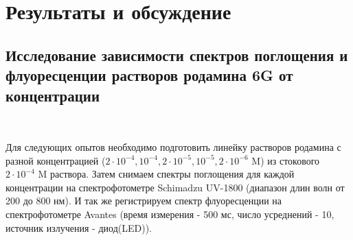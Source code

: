 \documentclass{article}
\begin{document}
\section{Результаты и обсуждение}
\subsection{Исследование зависимости спектров поглощения и флуоресценции растворов родамина 6G от концентрации}\
\par Для следующих опытов необходимо подготовить линейку растворов родамина с разной концентрацией ($2 \cdot 10^{-4}, 10^{-4}, 2 \cdot 10^{-5}, 10^{-5}, 2 \cdot 10^{-6}$ M) из стокового $2 \cdot 10^{-4}$ M раствора. Затем снимаем спектры поглощения для каждой концентрации на спектрофотометре Schimadzu UV-1800 (диапазон длин волн от 200 до 800 нм). И так же регистрируем спектр флуоресценции на спектрофотометре Avantes (время измерения - 500 мс, число усреднений - 10, источник излучения - диод(LED)).
\end{document}
